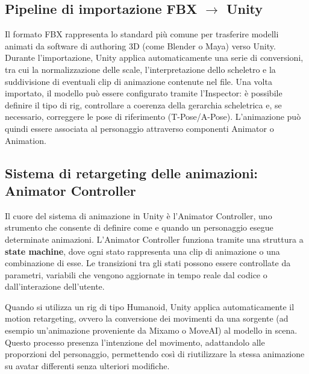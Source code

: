 \subsection{Pipeline di importazione FBX $\rightarrow$ Unity}
Il formato FBX rappresenta lo standard più comune per trasferire modelli animati da software di authoring 3D (come Blender o  Maya) verso Unity. Durante l'importazione, Unity applica automaticamente una serie di conversioni, tra cui la normalizzazione delle scale, l'interpretazione dello scheletro e la suddivisione di eventuali clip di animazione contenute nel file.
Una volta importato, il modello può essere configurato tramite l'Inspector: è possibile definire il tipo di rig, controllare a coerenza della gerarchia scheletrica e, se necessario, correggere le pose di riferimento (T-Pose/A-Pose). L'animazione può quindi essere associata al personaggio attraverso componenti Animator o Animation.

\subsection{Sistema di retargeting delle animazioni: Animator Controller}
Il cuore del sistema di animazione in Unity è l'Animator Controller, uno strumento che consente di definire come e quando un personaggio esegue determinate animazioni. L'Animator Controller funziona tramite una struttura a \textbf{state machine}, dove ogni stato rappresenta una clip di animazione o una combinazione di esse. Le transizioni tra gli stati possono essere controllate da parametri, variabili che vengono aggiornate in tempo reale dal codice o dall'interazione dell'utente.

Quando si utilizza un rig di tipo Humanoid, Unity applica automaticamente il motion retargeting, ovvero la conversione dei movimenti da una sorgente (ad esempio un'animazione proveniente da Mixamo o MoveAI) al modello in scena. Questo processo presenza l'intenzione del movimento, adattandolo alle proporzioni del personaggio, permettendo così di riutilizzare la stessa animazione su avatar differenti senza ulteriori modifiche.